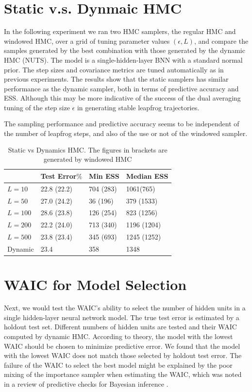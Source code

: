 \documentclass[12pt]{report}
\begin{document}
\section{Static  v.s. Dynmaic HMC}
In the following experiment we ran two HMC samplers, the regular HMC and windowed HMC, over a grid of tuning parameter values $(\epsilon,L)$, and compare the samples generated by the best combination with those generated by the dynamic HMC (NUTS). The model is a single-hidden-layer BNN with a standard normal prior.
The step sizes and covariance metrics are tuned automatically as in previous experiments. The results show that the static samplers has similar performance as the dynamic sampler, both in terms of predictive accuracy and ESS. Although this may be more indicative of the success of the dual averaging tuning of the step size $\epsilon$ in generating stable leapfrog trajectories. 


The sampling performance and predictive accuracy seems to be independent of the number of leapfrog steps, and also of the use or not of the windowed sampler. 
\begin{table}[]
\centering
\begin{tabular}{@{}llll@{}}
\toprule
        & Test Error$\%$ & Min ESS & Median ESS \\ \midrule
$L = 10 $  & 22.8 (22.2)    & 704 (283) & 1061(765)       \\ \midrule
$L = 50 $  & 27.0 (24.2)  & 36 (196)  & 379 (1533)     \\ \midrule
$L = 100  $  & 28.6 (23.8)  & 126 (254)  & 823 (1256)    \\ \midrule
$L = 200  $   & 22.2 (24.0)    & 713 (340)      & 1196 (1204)         \\ \midrule
$L = 500   $ & 23.8  (23.4)       & 345 (693)      & 1245  (1252)        \\ \midrule
Dynamic & 23.4         & 358       & 1348         \\ \bottomrule 
\end{tabular}
\caption{Static vs Dynamics HMC. The figures in brackets are generated by windowed HMC}
\label{my-label}
\end{table}

\section{WAIC for Model Selection}
Next, we would test the WAIC's ability to select the number of hidden units in a single hidden-layer neural network model. The true test error is estimated by a holdout test set. Different numbers of hidden units are tested and their WAIC computed by dynamic HMC. According to theory, the model with the lowest WAIC should be chosen to minimize predictive error.
We found that the model with the lowest WAIC does not match those selected by holdout test error. The failure of the WAIC to select the best model might be explained by the poor mixing of the importance sampler when estimating the WAIC, which was noted in a review of predictive checks for Bayesian inference \cite{vehtari2017practical} . 
\end{document}
